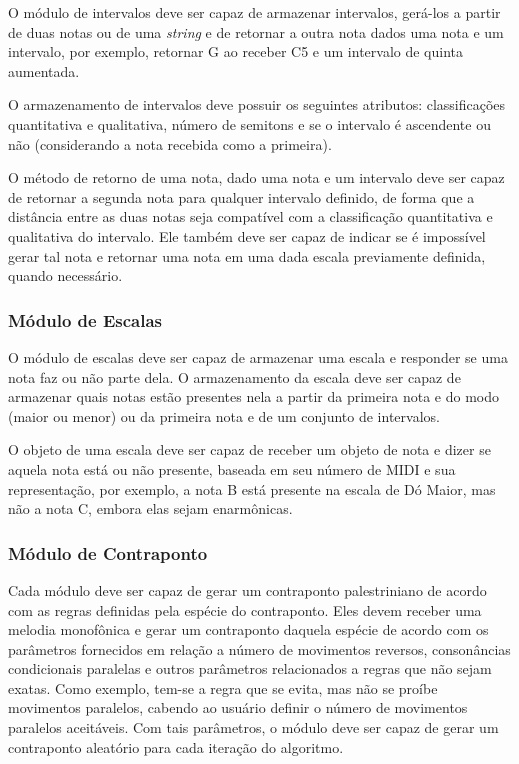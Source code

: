       O módulo de intervalos deve ser capaz de armazenar intervalos, gerá-los a partir de duas notas ou de uma \textit{string} e de retornar a outra nota dados uma nota e um intervalo, por exemplo, retornar G ao receber C5 e um intervalo de quinta aumentada.

      O armazenamento de intervalos deve possuir os seguintes atributos: classificações quantitativa e qualitativa, número de semitons e se o intervalo é ascendente ou não (considerando a nota recebida como a primeira).

      O método de retorno de uma nota, dado uma nota e um intervalo deve ser capaz de retornar a segunda nota para qualquer intervalo definido, de forma que a distância entre as duas notas seja compatível com a classificação quantitativa e qualitativa do intervalo. Ele também deve ser capaz de indicar se é impossível gerar tal nota e retornar uma nota em uma dada escala previamente definida, quando necessário.

    \subsubsection[Módulo de Escalas]{Módulo de Escalas}

      O módulo de escalas deve ser capaz de armazenar uma escala e responder se uma nota faz ou não parte dela. O armazenamento da escala deve ser capaz de armazenar quais notas estão presentes nela a partir da primeira nota e do modo (maior ou menor) ou da primeira nota e de um conjunto de intervalos.

      O objeto de uma escala deve ser capaz de receber um objeto de nota e dizer se aquela nota está ou não presente, baseada em seu número de MIDI e sua representação, por exemplo, a nota B está presente na escala de Dó Maior, mas não a nota C\fl{}, embora elas sejam enarmônicas.

    \subsubsection[Módulos de Contraponto]{Módulo de Contraponto}

      Cada módulo deve ser capaz de gerar um contraponto palestriniano de acordo com as regras definidas pela espécie do contraponto. Eles devem receber uma melodia monofônica e gerar um contraponto daquela espécie de acordo com os parâmetros fornecidos em relação a número de movimentos reversos, consonâncias condicionais paralelas e outros parâmetros relacionados a regras que não sejam exatas. Como exemplo, tem-se a regra que se evita, mas não se proíbe movimentos paralelos, cabendo ao usuário definir o número de movimentos paralelos aceitáveis. Com tais parâmetros, o módulo deve ser capaz de gerar um contraponto aleatório para cada iteração do algoritmo.

